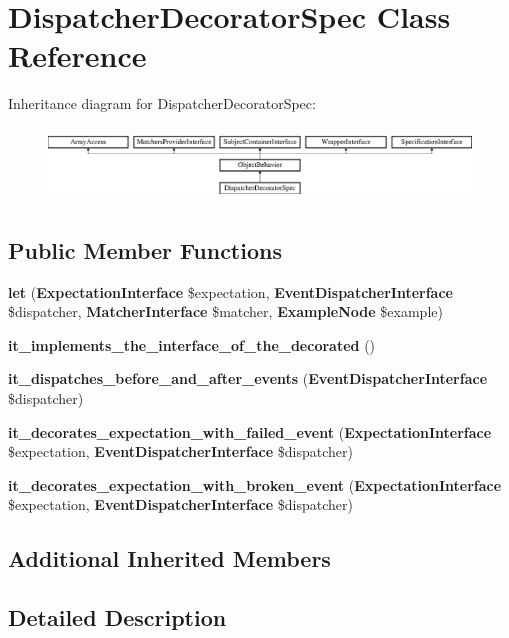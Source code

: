 \section{Dispatcher\+Decorator\+Spec Class Reference}
\label{classspec_1_1_php_spec_1_1_wrapper_1_1_subject_1_1_expectation_1_1_dispatcher_decorator_spec}
Inheritance diagram for Dispatcher\+Decorator\+Spec\+:\begin{figure}[H]
\begin{center}
\leavevmode
\includegraphics[height=1.953488cm]{classspec_1_1_php_spec_1_1_wrapper_1_1_subject_1_1_expectation_1_1_dispatcher_decorator_spec}
\end{center}
\end{figure}
\subsection*{Public Member Functions}
\begin{DoxyCompactItemize}
\item 
{\bf let} ({\bf Expectation\+Interface} \$expectation, {\bf Event\+Dispatcher\+Interface} \$dispatcher, {\bf Matcher\+Interface} \$matcher, {\bf Example\+Node} \$example)
\item 
{\bf it\+\_\+implements\+\_\+the\+\_\+interface\+\_\+of\+\_\+the\+\_\+decorated} ()
\item 
{\bf it\+\_\+dispatches\+\_\+before\+\_\+and\+\_\+after\+\_\+events} ({\bf Event\+Dispatcher\+Interface} \$dispatcher)
\item 
{\bf it\+\_\+decorates\+\_\+expectation\+\_\+with\+\_\+failed\+\_\+event} ({\bf Expectation\+Interface} \$expectation, {\bf Event\+Dispatcher\+Interface} \$dispatcher)
\item 
{\bf it\+\_\+decorates\+\_\+expectation\+\_\+with\+\_\+broken\+\_\+event} ({\bf Expectation\+Interface} \$expectation, {\bf Event\+Dispatcher\+Interface} \$dispatcher)
\end{DoxyCompactItemize}
\subsection*{Additional Inherited Members}


\subsection{Detailed Description}


